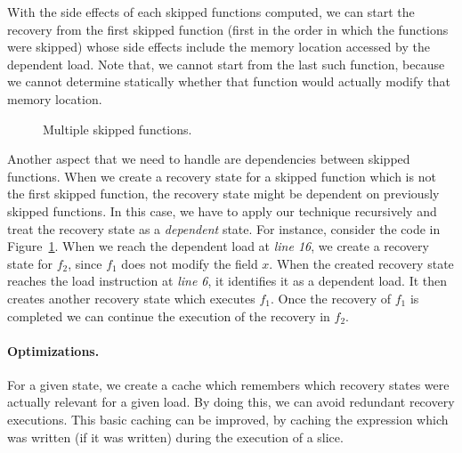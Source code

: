 With the side effects of each skipped functions computed, we can start
the recovery from the first skipped function (first in the order in
which the functions were skipped) whose side effects include the
memory location accessed by the dependent load.  Note that, we cannot
start from the last such function, because we cannot determine
statically whether that function would actually modify that memory
location.



\begin{figure}[tbp]

\caption{Multiple skipped functions.}
\label{fig:multiple-skipped-functions}
\end{figure}


Another aspect that we need to handle are dependencies between
skipped functions.  When we create a recovery state for a skipped
function which is not the first skipped function, the recovery state
might be dependent on previously skipped functions.  In this case, we
have to apply our technique recursively and treat the recovery state
as a \textit{dependent} state.  For instance, consider the code in
Figure~\ref{fig:multiple-skipped-functions}.  When we reach the
dependent load at \textit{line 16}, we create a recovery state for
$f_2$, since $f_1$ does not modify the field $x$.  When the created
recovery state reaches the load instruction at \textit{line 6}, it
identifies it as a dependent load.  It then creates another recovery
state which executes $f_1$.  Once the recovery of $f_1$ is completed
we can continue the execution of the recovery in $f_2$.

\paragraph{Optimizations.} For a given state, we create a cache which
remembers which recovery states were actually relevant for a given
load.  By doing this, we can avoid redundant recovery executions.
This basic caching can be improved, by caching the expression which
was written (if it was written) during the execution of a slice.





